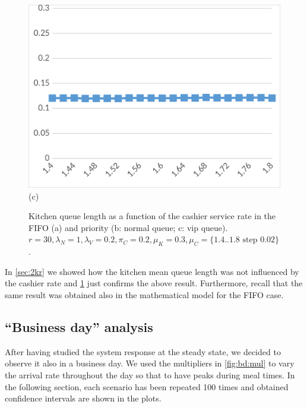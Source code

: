 \begin{figure}
\begin{minipage}{0.32\textwidth}
    \includegraphics[width=\textwidth]{figs/inv_ql_vip.png}
    (c)
  \end{minipage}
  \caption{Kitchen queue length as a function of the cashier service rate in the FIFO (a) and priority (b: normal queue; c: vip queue). 
  $r=30,\lambda_N=1,\lambda_V=0.2,\pi_C=0.2,\mu_K=0.3,\mu_C=\{1.4..1.8 \text{ step } 0.02\}$.}
  \label{fig:inv_ql}
\end{figure}

In \cref{sec:2kr} we showed how the kitchen mean queue length was not influenced by the cashier rate and \cref{fig:inv_ql} just confirms the above result. Furthermore, recall that the same result was obtained also in the mathematical model for the FIFO case.

\subsection{``Business day'' analysis}
After having studied the system response at the steady state, we decided to observe it also in a business day. We used the multipliers in \cref{fig:bd:mul} to vary the arrival rate throughout the day so that to have peaks during meal times. In the following section, each scenario has been repeated 100 times and obtained confidence intervals are shown in the plots.

